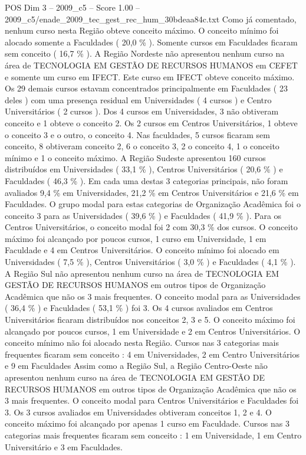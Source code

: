 \begin{textsample}{POS Dim 3 – 2009\_c5 – Score 1.00 – 2009\_c5/enade\_2009\_tec\_gest\_rec\_hum\_30bdeaa84c.txt}
Como já comentado, nenhum curso nesta Região obteve conceito máximo.
O conceito mínimo foi alocado somente a Faculdades ( 20,0 \% ).
Somente cursos em Faculdades ficaram sem conceito ( 16,7 \% ).
A Região Nordeste não apresentou nenhum curso na área de TECNOLOGIA EM GESTÃO DE RECURSOS HUMANOS em CEFET e somente um curso em IFECT.
Este curso em IFECT obteve conceito máximo.
Os 29 demais cursos estavam concentrados principalmente em Faculdades ( 23 deles ) com uma presença residual em Universidades ( 4 cursos ) e Centro Universitários ( 2 cursos ).
Dos 4 cursos em Universidades, 3 não obtiveram conceito e 1 obteve o conceito 2.
Os 2 cursos em Centros Universitários, 1 obteve o conceito 3 e o outro, o conceito 4.
Nas faculdades, 5 cursos ficaram sem conceito, 8 obtiveram conceito 2, 6 o conceito 3, 2 o conceito 4, 1 o conceito mínimo e 1 o conceito máximo.
A Região Sudeste apresentou 160 cursos distribuídos em Universidades ( 33,1 \% ), Centros Universitários ( 20,6 \% ) e Faculdades ( 46,3 \% ).
Em cada uma destas 3 categorias principais, não foram avaliados 9,4 \% em Universidades, 21,2 \% em Centros Universitários e 21,6 \% em Faculdades.
O grupo modal para estas categorias de Organização Acadêmica foi o conceito 3 para as Universidades ( 39,6 \% ) e Faculdades ( 41,9 \% ).
Para os Centros Universitários, o conceito modal foi 2 com 30,3 \% dos cursos.
O conceito máximo foi alcançado por poucos cursos, 1 curso em Universidade, 1 em Faculdade e 4 em Centros Universitários.
O conceito mínimo foi alocado em Universidades ( 7,5 \% ), Centros Universitários ( 3,0 \% ) e Faculdades ( 4,1 \% ).
A Região Sul não apresentou nenhum curso na área de TECNOLOGIA EM GESTÃO DE RECURSOS HUMANOS em outros tipos de Organização Acadêmica que não os 3 mais frequentes.
O conceito modal para as Universidades ( 36,4 \% ) e Faculdades ( 53,1 \% ) foi 3.
Os 4 cursos avaliados em Centros Universitários ficaram distribuídos nos conceitos 2, 3 e 5.
O conceito máximo foi alcançado por poucos cursos, 1 em Universidade e 2 em Centros Universitários.
O conceito mínimo não foi alocado nesta Região.
Cursos nas 3 categorias mais frequentes ficaram sem conceito : 4 em Universidades, 2 em Centro Universitários e 9 em Faculdades Assim como a Região Sul, a Região Centro-Oeste não apresentou nenhum curso na área de TECNOLOGIA EM GESTÃO DE RECURSOS HUMANOS em outros tipos de Organização Acadêmica que não os 3 mais frequentes.
O conceito modal para Centros Universitários e Faculdades foi 3.
Os 3 cursos avaliados em Universidades obtiveram conceitos 1, 2 e 4.
O conceito máximo foi alcançado por apenas 1 curso em Faculdade.
Cursos nas 3 categorias mais frequentes ficaram sem conceito : 1 em Universidade, 1 em Centro Universitário e 3 em Faculdades.

\end{textsample}
